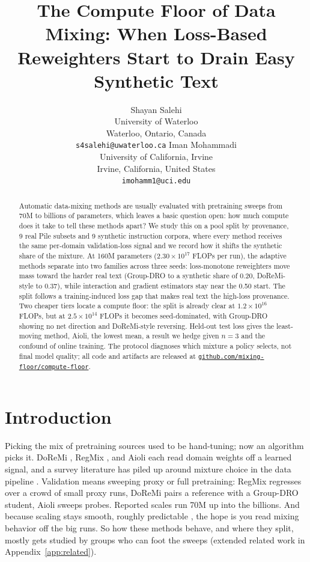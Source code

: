 \documentclass{article}
\title{The Compute Floor of Data Mixing: When Loss-Based Reweighters Start to Drain Easy Synthetic Text}
\author{Shayan Salehi \\
University of Waterloo \\
Waterloo, Ontario, Canada \\
\texttt{s4salehi@uwaterloo.ca}
\And
Iman Mohammadi \\
University of California, Irvine \\
Irvine, California, United States \\
\texttt{imohamm1@uci.edu}
}
\newcommand{\repolink}{\href{https://github.com/mixing-floor/compute-floor}{\texttt{github.com/mixing-floor/compute-floor}}}
\begin{document}
\maketitle

\begin{abstract}
Automatic data-mixing methods are usually evaluated with pretraining sweeps from 70M to billions of parameters, which leaves a basic question open: how much compute does it take to tell these methods apart? We study this on a pool split by provenance, 9 real Pile subsets and 9 synthetic instruction corpora, where every method receives the same per-domain validation-loss signal and we record how it shifts the synthetic share of the mixture. At 160M parameters ($2.30\times10^{17}$ FLOPs per run), the adaptive methods separate into two families across three seeds: loss-monotone reweighters move mass toward the harder real text (Group-DRO to a synthetic share of 0.20, DoReMi-style to 0.37), while interaction and gradient estimators stay near the 0.50 start. The split follows a training-induced loss gap that makes real text the high-loss provenance. Two cheaper tiers locate a compute floor: the split is already clear at $1.2\times10^{16}$ FLOPs, but at $2.5\times10^{14}$ FLOPs it becomes seed-dominated, with Group-DRO showing no net direction and DoReMi-style reversing. Held-out test loss gives the least-moving method, Aioli, the lowest mean, a result we hedge given $n=3$ and the confound of online training. The protocol diagnoses which mixture a policy selects, not final model quality; all code and artifacts are released at \repolink.
\end{abstract}

\section{Introduction}

Picking the mix of pretraining sources used to be hand-tuning; now an algorithm picks it. DoReMi \citep{doremi2023}, RegMix \citep{regmix2025}, and Aioli \citep{aioli2024} each read domain weights off a learned signal, and a survey literature has piled up around mixture choice in the data pipeline \citep{albalak2024survey}. Validation means sweeping proxy or full pretraining: RegMix regresses over a crowd of small proxy runs, DoReMi pairs a reference with a Group-DRO student, Aioli sweeps probes. Reported scales run 70M up into the billions. And because scaling stays smooth, roughly predictable \citep{kaplan2020scaling}, the hope is you read mixing behavior off the big runs. So how these methods behave, and where they split, mostly gets studied by groups who can foot the sweeps (extended related work in Appendix~\ref{app:related}).
\end{document}
